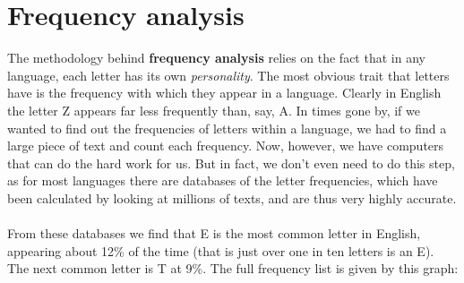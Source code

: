 \documentclass[Lau,binding=0.6cm,oneside]{sapthesis}
\begin{document}
\section{Frequency analysis}
The methodology behind \textbf{frequency analysis} relies on the fact that in any language, each letter has its own \textit{personality}. The most obvious trait that letters have is the frequency with which they appear in a language. Clearly in English the letter \textsf{Z} appears far less frequently than, say, \textsf{A}. In times gone by, if we wanted to find out the frequencies of letters within a language, we had to find a large piece of text and count each frequency. Now, however, we have computers that can do the hard work for us. But in fact, we don't even need to do this step, as for most languages there are databases of the letter frequencies, which have been calculated by looking at millions of texts, and are thus very highly accurate\supercite{digram_frequencies}.\\\\
From these databases we find that \textsf{E} is the most common letter in English, appearing about 12\% of the time (that is just over one in ten letters is an \textsf{E}). The next common letter is \textsf{T} at 9\%. The full frequency list is given by this graph:\\\\
\end{document}
